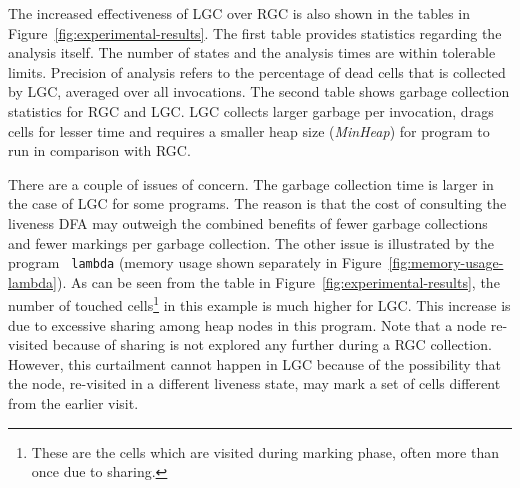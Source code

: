 \documentclass[9pt]{sigplanconf}
\begin{document}
\begin{enumerate}
The  increased effectiveness  of LGC  over RGC  is also  shown  in the
tables  in  Figure~\ref{fig:experimental-results}.   The  first  table
provides  statistics  regarding the  analysis  itself.  The number  of
states and the analysis times  are within tolerable limits. Precision
of analysis refers to the percentage of dead cells that is collected by
LGC, averaged over all invocations.
The second table shows garbage  collection statistics for RGC and LGC.
LGC  collects larger garbage  per invocation,  drags cells  for lesser
time and requires a smaller heap size ({\em MinHeap}) for program to
run
in comparison with  RGC.

There are a couple of  issues of concern.  The garbage collection time
is larger in the case of LGC for some programs. The reason is that the
cost of consulting the liveness DFA may outweigh the combined benefits
of  fewer   garbage  collections   and  fewer  markings   per  garbage
collection.   The  other issue  is  illustrated  by  the program  {\tt
  lambda}    (memory   usage  shown   separately    in
Figure~\ref{fig:memory-usage-lambda}).  As can be seen from the table
in Figure~\ref{fig:experimental-results}, the  number of
touched cells\footnote{These  are the  cells which are  visited during
  marking phase, often  more than once due to  sharing.} in this
example is much higher for
LGC.  This  increase is due to  excessive sharing among  heap nodes in
this program.  Note  that a node re-visited because  of sharing is not
explored  any   further  during  a  RGC   collection.   However,  this
curtailment cannot happen in  LGC because of the possibility that the
node,  re-visited in a  different liveness  state, may  mark a  set of
cells different from the earlier visit.
\begin{figure}[t]
\footnotesize


\end{figure}
\end{enumerate}
\end{document}
